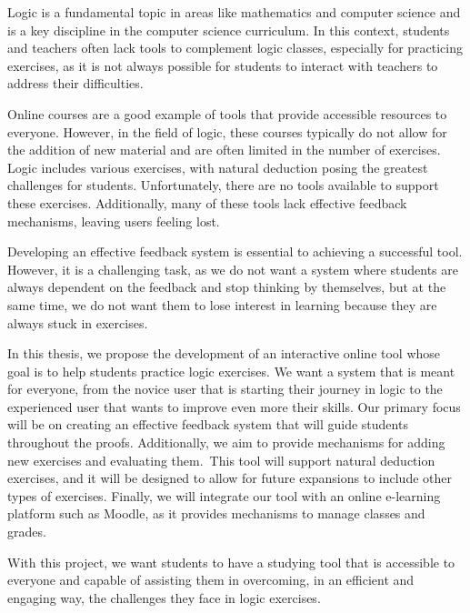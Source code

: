 
%

Logic is a fundamental topic in areas like mathematics and computer science and is a key discipline in the computer science curriculum. In this context, students and teachers often lack tools to complement logic classes, especially for practicing exercises, as it is not always possible for students to interact with teachers to address their difficulties.

Online courses are a good example of tools that provide accessible resources to everyone. However, in the field of logic, these courses typically do not allow for the addition of new material and are often limited in the number of exercises. Logic includes various exercises, with natural deduction posing the greatest challenges for students. Unfortunately, there are no tools available to support these exercises. Additionally, many of these tools lack effective feedback mechanisms, leaving users feeling lost.

Developing an effective feedback system is essential to achieving a successful tool. However, it is a challenging task, as we do not want a system where students are always dependent on the feedback and stop thinking by themselves, but at the same time, we do not want them to lose interest in learning because they are always stuck in exercises.

In this thesis, we propose the development of an interactive online tool whose goal is to help students practice logic exercises. We want a system that is meant for everyone, from the novice user that is starting their journey in logic to the experienced user that wants to improve even more their skills. Our primary focus will be on creating an effective feedback system that will guide students throughout the proofs. Additionally, we aim to provide mechanisms for adding new exercises and evaluating them. This tool will support natural deduction exercises, and it will be designed to allow for future expansions to include other types of exercises. Finally, we will integrate our tool with an online e-learning platform such as Moodle, as it provides mechanisms to manage classes and grades.

With this project, we want students to have a studying tool that is accessible to everyone and capable of assisting them in overcoming, in an efficient and engaging way, the challenges they face in logic exercises.

